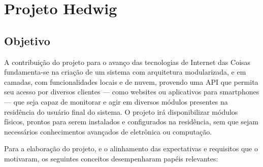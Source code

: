 \section{Projeto Hedwig}

\subsection{Objetivo}
A contribuição do projeto para o avanço das tecnologias de Internet das Coisas fundamenta-se na criação de um sistema com arquitetura modularizada, e em camadas, com funcionalidades locais e de nuvem, provendo uma API que permita seu acesso por diversos clientes --- como websites ou aplicativos para smartphones --- que seja capaz de monitorar e agir em diversos módulos presentes na residência do usuário final do sistema. O projeto irá disponibilizar módulos físicos, prontos para serem instalados e configurados na residência, sem que sejam necessários conhecimentos avançados de eletrônica ou computação.

Para a elaboração do projeto, e o alinhamento das expectativas e requisitos que o motivaram, os seguintes conceitos desempenharam papéis relevantes:

